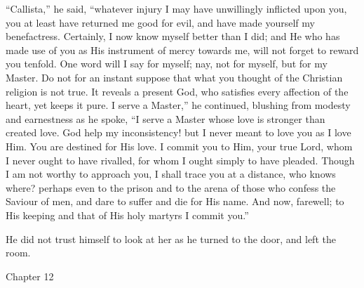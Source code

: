 ``Callista,'' he said, ``whatever injury I may have
unwillingly inflicted upon you, you at least have returned me good for
evil, and have made yourself my benefactress. Certainly, I now know
myself better than I did; and He who has made use of you as His
instrument of mercy towards me, will not forget to reward you tenfold.
One word will I say for myself; nay, not for myself, but for my
Master. Do not for an instant suppose that what you thought of the
Christian religion is not true. It reveals a present God, who
satisfies every affection of the heart, yet keeps it pure. I
serve a Master,'' he continued, blushing from modesty and
earnestness as he spoke, ``I serve a Master whose love is stronger
than created love. God help my inconsistency! but I never meant to
love you as I love Him. You are destined for His love. I commit you to
Him, your true Lord, whom I never ought to have rivalled, for whom I
ought simply to have pleaded. Though I am not worthy to approach you,
I shall trace you at a distance, who knows where? perhaps even to the
prison and to the arena of those who confess the Saviour of men, and
dare to suffer and die for His name. And now, farewell; to His keeping
and that of His holy martyrs I commit you.''

He did not trust himself to look at her as he turned to the door,
and left the room.

Chapter 12


